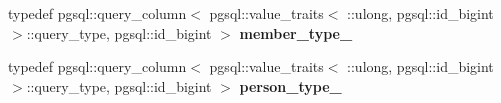 \begin{DoxyCompactItemize}
\item 
typedef pgsql\+::query\+\_\+column$<$ pgsql\+::value\+\_\+traits$<$ \+::ulong, pgsql\+::id\+\_\+bigint $>$\+::query\+\_\+type, pgsql\+::id\+\_\+bigint $>$ {\bfseries member\+\_\+type\+\_\+}\hypertarget{structodb_1_1pointer__query__columns_3_01_1_1kpk_1_1data_1_1_loan_00_01id__pgsql_00_01_a_01_4_a691c0583fddecd0fc28317da5022efc3}{}\label{structodb_1_1pointer__query__columns_3_01_1_1kpk_1_1data_1_1_loan_00_01id__pgsql_00_01_a_01_4_a691c0583fddecd0fc28317da5022efc3}

\item 
typedef pgsql\+::query\+\_\+column$<$ pgsql\+::value\+\_\+traits$<$ \+::ulong, pgsql\+::id\+\_\+bigint $>$\+::query\+\_\+type, pgsql\+::id\+\_\+bigint $>$ {\bfseries person\+\_\+type\+\_\+}\hypertarget{structodb_1_1pointer__query__columns_3_01_1_1kpk_1_1data_1_1_loan_00_01id__pgsql_00_01_a_01_4_a59c756e62280501795410d19aa89c3b5}{}\label{structodb_1_1pointer__query__columns_3_01_1_1kpk_1_1data_1_1_loan_00_01id__pgsql_00_01_a_01_4_a59c756e62280501795410d19aa89c3b5}

\end{DoxyCompactItemize}

